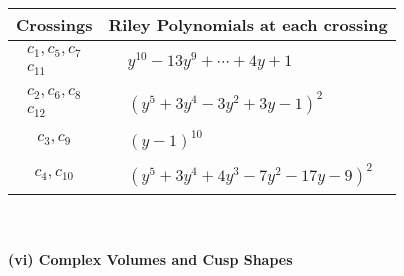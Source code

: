 \documentclass[1p]{elsarticle_modified}
\theoremstyle{definition}
\begin{document}
\begin{tabular}{m{50pt}|m{274pt}}
Crossings & \hspace{64pt}Riley Polynomials at each crossing \\
\hline $$\begin{aligned}c_{1},c_{5},c_{7}\\c_{11}\end{aligned}$$&$\begin{aligned}
&y^{10}-13 y^9+\cdots+4 y+1
\end{aligned}$\\
\hline $$\begin{aligned}c_{2},c_{6},c_{8}\\c_{12}\end{aligned}$$&$\begin{aligned}
&(y^5+3 y^4-3 y^2+3 y-1)^2
\end{aligned}$\\
\hline $$\begin{aligned}c_{3},c_{9}\end{aligned}$$&$\begin{aligned}
&(y-1)^{10}
\end{aligned}$\\
\hline $$\begin{aligned}c_{4},c_{10}\end{aligned}$$&$\begin{aligned}
&(y^5+3 y^4+4 y^3-7 y^2-17 y-9)^2
\end{aligned}$\\
\hline
\end{tabular}\\~\\
\newpage\flushleft \textbf{(vi) Complex Volumes and Cusp Shapes}
\end{document}
